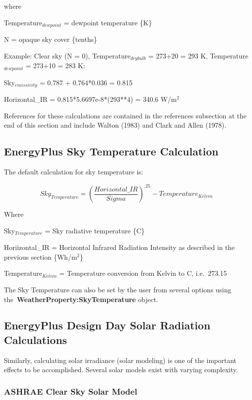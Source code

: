where

Temperature\(_{dewpoint}\) = dewpoint temperature \{K\}

N = opaque sky cover \{tenths\}

Example: Clear sky (N = 0), Temperature\(_{drybulb}\) = 273+20 = 293 K, Temperature\(_{dewpoint}\) = 273+10 = 283 K:

Sky\(_{emissivity}\) = 0.787 + 0.764*0.036 = 0.815

Horizontal\_IR = 0.815*5.6697e-8*(293**4) = 340.6 W/m\(^{2}\)

References for these calculations are contained in the references subsection at the end of this  section and include Walton (1983) and Clark and Allen (1978).

\subsection{EnergyPlus Sky Temperature Calculation}\label{energyplus-sky-temperature-calculation}

The default calculation for sky temperature is:

\begin{equation}
Sk{y_{Temperature}} = {\left( {\frac{{Horizontal\_IR}}{{Sigma}}} \right)^{.25}} - Temperatur{e_{Kelvin}}
\end{equation}

Where

Sky\(_{Temperature}\) = Sky radiative temperature \{C\}

Horiizontal\_IR = Horizontal Infrared Radiation Intensity as described in the previous section \{Wh/m\(^{2}\)\}

Temperature\(_{Kelvin}\) = Temperature conversion from Kelvin to C, i.e.~273.15

The Sky Temperature can also be set by the user from several options using the~\textbf{WeatherProperty:SkyTemperature} object.

\subsection{EnergyPlus Design Day Solar Radiation Calculations}\label{energyplus-design-day-solar-radiation-calculations}

Similarly, calculating solar irradiance (solar modeling) is one of the important effects to be accomplished. Several solar models exist with varying complexity.

\subsubsection{ASHRAE Clear Sky Solar Model}\label{ashrae-clear-sky-solar-model}

